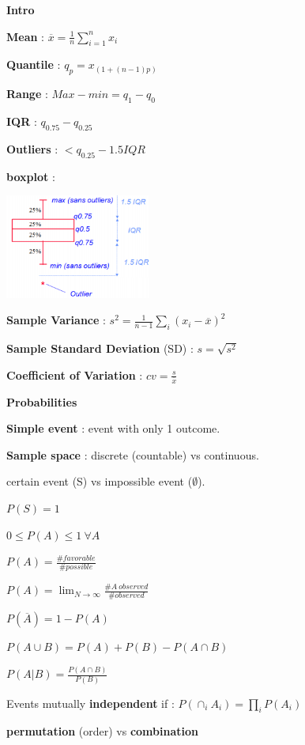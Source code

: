 \documentclass[a4paper,10.5pt]{article}
\begin{document}
	\begin{multicols}{4}
		\setlength{\columnseprule}{1pt}
		\textbf{Intro}
		
		\textbf{Mean} : $\overline{x} = \frac{1}{n} \sum_{i=1}^{n} x_i$
		
		\textbf{Quantile} : $q_p = x_{(1+(n-1)p)}$
		
		\textbf{Range} : $Max-min = q_1 - q_0$
		
		\textbf{IQR} : $q_{0.75} - q_{0.25}$
		
		\textbf{Outliers} : $< q_{0.25} - 1.5 IQR$
		
		\textbf{boxplot} :
		
		\includegraphics[width=4.8cm]{img/boxplot.PNG}
		
		\textbf{Sample Variance} : $s^2 = \frac{1}{n-1}\sum_i (x_i - \overline{x})^2$
		
		\textbf{Sample Standard Deviation} (SD) : $s = \sqrt{s^2}$
		
		\textbf{Coefficient of Variation} : $cv = \frac{s}{\overline{x}}$
		
		\textbf{Probabilities}
		
		\textbf{Simple event} : event with only 1 outcome.
		
		\textbf{Sample space} : discrete (countable) vs continuous.
		
		certain event (S) vs impossible event ($\emptyset$).
		
		$P(S) = 1$
		
		$0 \leq P(A) \leq 1\ \forall A$
		
		$P(A) = \frac{\# favorable}{\# possible}$
		
		$P(A) = \lim_{N \to \infty} \frac{\#A\ observed }{\#observed}$
		
		$P(\overline{A}) = 1-P(A)$
		
		$P(A \cup B) = P(A) + P(B) - P(A\cap B)$
		
		$P(A|B) = \frac{P(A\cap B)}{P(B)}$
		
		Events mutually \textbf{independent} if : $P(\cap_{i} A_i) = \prod_i P(A_i)$
		
		\textbf{permutation} (order) vs \textbf{combination}
		

\end{multicols}
\end{document}
